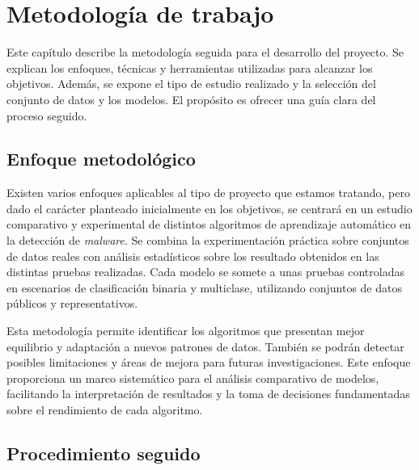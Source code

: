 \chapter{Metodología de trabajo}
\label{ch:metodologia}

Este capítulo describe la metodología seguida para el desarrollo del proyecto. Se explican los enfoques, técnicas y herramientas utilizadas para alcanzar los objetivos. Además, se expone el tipo de estudio realizado y la selección del conjunto de datos y los modelos. El propósito es ofrecer una guía clara del proceso seguido.

\section{Enfoque metodológico}
\label{sec:enfoque}

Existen varios enfoques aplicables al tipo de proyecto que estamos tratando, pero dado el carácter planteado inicialmente en los objetivos, se centrará en un estudio comparativo y experimental de distintos algoritmos de aprendizaje automático en la detección de \textit{malware}. Se combina la experimentación práctica sobre conjuntos de datos reales con análisis estadísticos sobre los resultado obtenidos en las distintas pruebas realizadas. Cada modelo se somete a unas pruebas controladas en escenarios de clasificación binaria y multiclase, utilizando conjuntos de datos públicos y representativos.

\vspace{1em}

Esta metodología permite identificar los algoritmos que presentan mejor equilibrio y adaptación a nuevos patrones de datos. También se podrán detectar posibles limitaciones y áreas de mejora para futuras investigaciones. Este enfoque proporciona un marco sistemático para el análisis comparativo de modelos, facilitando la interpretación de resultados y la toma de decisiones fundamentadas sobre el rendimiento de cada algoritmo.

\section{Procedimiento seguido}
\label{sec:porcedimiento}




